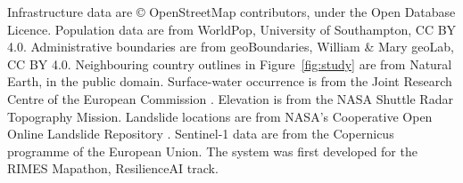 \documentclass[10pt,a4paper,twocolumn]{article}
\begin{document}
Infrastructure data are \copyright{} OpenStreetMap contributors, under the Open Database Licence. Population data are from WorldPop, University of Southampton, CC BY 4.0. Administrative boundaries are from geoBoundaries, William \& Mary geoLab, CC BY 4.0. Neighbouring country outlines in Figure~\ref{fig:study} are from Natural Earth, in the public domain. Surface-water occurrence is from the Joint Research Centre of the European Commission \citep{pekel2016}. Elevation is from the NASA Shuttle Radar Topography Mission. Landslide locations are from NASA's Cooperative Open Online Landslide Repository \citep{juang2019}. Sentinel-1 data are from the Copernicus programme of the European Union. The system was first developed for the RIMES Mapathon, ResilienceAI track.



\end{document}
